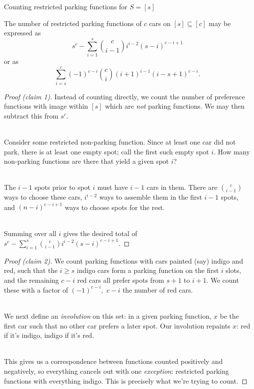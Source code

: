 \documentclass[table, dvipsnames]{beamer}
\begin{document}
\begin{frame}{Counting restricted parking functions for $S = [s]$}
    \begin{theorem}
        The number of restricted parking functions of $c$ cars on $[s]\subseteq [c]$ may be expressed as
        \[s^c-\sum_{i=1}^s \binom{c}{i-1}i^{i-2}(s-i)^{c-i+1}\]
        or as
        \[\sum_{i=s}^{c} (-1)^{c - i} \binom{c}{i}(i+1)^{i-1}(i - s + 1)^{c-i}.\]
    \end{theorem}	
\end{frame}

\begin{frame}
\begin{proof}[Proof (claim 1)]
    Instead of counting directly, we count the number of preference functions with image within $[s]$ which are \textit{not} parking functions. We may then subtract this from $s^c$.\\~\pause
    
    Consider some restricted non-parking function. Since at least one car did not park, there is at least one empty spot; call the first such empty spot $i.$ How many non-parking functions are there that yield a given spot $i$?\\~\pause

    The $i-1$ spots prior to spot $i$ must have $i-1$ cars in them. There are $\binom{c}{i-1}$ ways to choose these cars, $i^{i-2}$ ways to assemble them in the first $i-1$ spots, and $(n-i)^{c-i+1}$ ways to choose spots for the rest.\\~\pause

    Summing over all $i$ gives the desired total of $s^c-\sum_{i=1}^s \binom{c}{i-1}i^{i-2}(s-i)^{c-i+1}.$
\end{proof}
\end{frame}

\begin{frame}
\begin{proof}[Proof (claim 2)]
We count parking functions with cars painted (say) indigo and red, such that the $i\ge s$ indigo cars form a parking function on the first $i$ slots, and the remaining $c-i$ red cars all prefer spots from $s+1$ to $i+1.$ We count these with a factor of $(-1)^{c-i},$ $c-i$ the number of red cars.\\~\pause

We next define an \textit{involution} on this set: in a given parking function, $x$ be the first car such that no other car prefers a later spot. Our involution repaints $x$: red if it's indigo, indigo if it's red.\\~\pause

This gives us a correspondence between functions counted positively and negatively, so everything cancels out with one \textit{exception}: restricted parking functions with everything indigo. This is precisely what we're trying to count.
\end{proof}
\end{frame}
\end{document}
